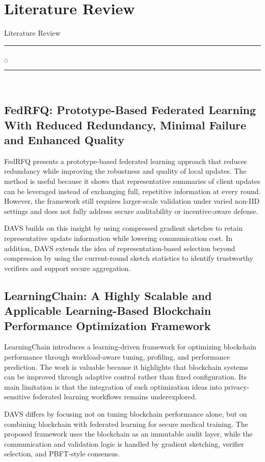 \chapter[Literature Review]{Literature Review}{Literature Review}\label{lit}
\noindent
\rule{0.49\textwidth}{0.75pt} $_{\bigcirc}$ \rule{0.49\textwidth}{0.75pt}\\

\begingroup
\linespread{0.8}\selectfont
\section{FedRFQ: Prototype-Based Federated Learning With Reduced Redundancy, Minimal Failure and Enhanced Quality}
\endgroup
FedRFQ presents a prototype-based federated learning approach that reduces redundancy while improving the robustness and quality of local updates. The method is useful because it shows that representative summaries of client updates can be leveraged instead of exchanging full, repetitive information at every round. However, the framework still requires larger-scale validation under varied non-IID settings and does not fully address secure auditability or incentive-aware defense.

DAVS builds on this insight by using compressed gradient sketches to retain representative update information while lowering communication cost. In addition, DAVS extends the idea of representation-based selection beyond compression by using the current-round sketch statistics to identify trustworthy verifiers and support secure aggregation.

\begingroup
\linespread{0.8}\selectfont
\section{LearningChain: A Highly Scalable and Applicable Learning-Based Blockchain Performance Optimization Framework}
\endgroup
LearningChain introduces a learning-driven framework for optimizing blockchain performance through workload-aware tuning, profiling, and performance prediction. The work is valuable because it highlights that blockchain systems can be improved through adaptive control rather than fixed configuration. Its main limitation is that the integration of such optimization ideas into privacy-sensitive federated learning workflows remains underexplored.

DAVS differs by focusing not on tuning blockchain performance alone, but on combining blockchain with federated learning for secure medical training. The proposed framework uses the blockchain as an immutable audit layer, while the communication and validation logic is handled by gradient sketching, verifier selection, and PBFT-style consensus.

